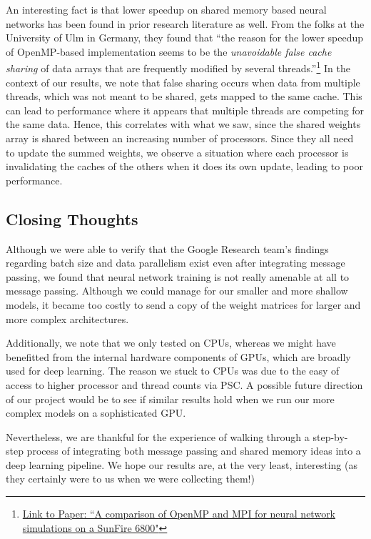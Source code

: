 \documentclass{article}
\begin{document}
An interesting fact is that lower speedup on shared memory based neural networks has been found in prior research literature as well. From the folks at the University of Ulm in Germany, they found that “the reason for the lower speedup of OpenMP-based implementation seems to be the \textit{unavoidable false cache sharing} of data arrays that are frequently modified by several threads.”\footnote{\href{https://citeseerx.ist.psu.edu/viewdoc/download?doi=10.1.1.595.8618&rep=rep1&type=pdf}{Link to Paper: ``A comparison of OpenMP and MPI for neural network simulations on a SunFire 6800"}} In the context of our results, we note that false sharing occurs when data from multiple threads, which was not meant to be shared, gets mapped to the same cache. This can lead to performance where it appears that multiple threads are competing for the same data. Hence, this correlates with what we saw, since the shared weights array is shared between an increasing number of processors. Since they all need to update the summed weights, we observe a situation where each processor is invalidating the caches of the others when it does its own update, leading to poor performance.

\subsection{Closing Thoughts}

Although we were able to verify that the Google Research team's findings regarding batch size and data parallelism exist even after integrating message passing, we found that neural network training is not really amenable at all to message passing. Although we could manage for our smaller and more shallow models, it became too costly to send a copy of the weight matrices for larger and more complex architectures.

Additionally, we note that we only tested on CPUs, whereas we might have benefitted from the internal hardware components of GPUs, which are broadly used for deep learning. The reason we stuck to CPUs was due to the easy of access to higher processor and thread counts via PSC. A possible future direction of our project would be to see if similar results hold when we run our more complex models on a sophisticated GPU.

Nevertheless, we are thankful for the experience of walking through a step-by-step process of integrating both message passing and shared memory ideas into a deep learning pipeline. We hope our results are, at the very least, interesting (as they certainly were to us when we were collecting them!)
\end{document}
